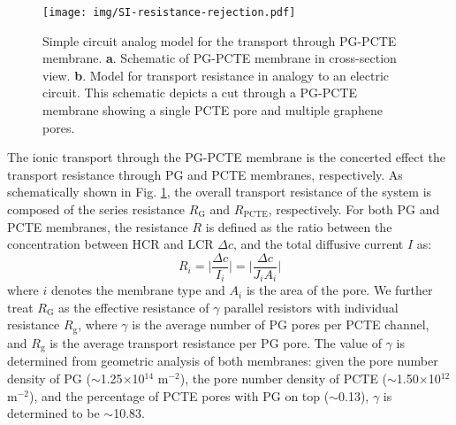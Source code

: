 \documentclass[manuscript=suppinfo,email=true, hyperref=true, keywords=false]{achemso}
\newcommand{\Fig}{Fig.}
\begin{document}
\begin{figure}[htbp]
  \centering
  \texttt{[image: img/SI-resistance-rejection.pdf]}
  \caption{Simple circuit analog model for the transport through
    PG-PCTE membrane. \textbf{a}. Schematic of PG-PCTE membrane in
    cross-section view. \textbf{b}. Model for transport resistance in
    analogy to an electric circuit. This schematic depicts a cut
    through a PG-PCTE membrane showing a single PCTE pore and multiple
    graphene pores.}
  \label{fig:R-model}
\end{figure}
The ionic transport through the PG-PCTE membrane is the concerted
effect the transport resistance through PG and PCTE membranes,
respectively. As schematically shown in \Fig{} \ref{fig:R-model}, the
overall transport resistance of the system is composed of the series
resistance $R_{\mathrm{G}}$ and $R_{\mathrm{PCTE}}$, respectively. For
both PG and PCTE membranes, the resistance $R$ is defined as the ratio
between the concentration between HCR and LCR $\Delta c$, and the total diffusive current $I$ as:
\begin{equation}
\label{eq:1}
R_{i} = \Bigg|\frac{\Delta c}{I_{i}}\Bigg| =  \Bigg|\frac{\Delta c}{J_{i}A_{i}}\Bigg|
\end{equation}
where $i$ denotes the membrane type and $A_{i}$ is the area of the
pore. We further treat $R_{\mathrm{G}}$ as the effective resistance of
$\gamma$ parallel resistors with individual resistance
$R_{\mathrm{g}}$, where $\gamma$ is the average number of PG pores per
PCTE channel, and $R_{\mathrm{g}}$ is the average transport resistance
per PG pore. The value of $\gamma$ is determined from geometric
analysis of both membranes: given the pore number density of PG
($\sim$1.25$\times$10$^{14}$ m$^{-2}$), the pore number density of
PCTE ($\sim$1.50$\times$10$^{12}$ m$^{-2}$), and the percentage of
PCTE pores with PG on top ($\sim$0.13), $\gamma$ is determined to be
$\sim$10.83.
\end{document}
